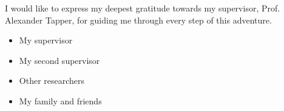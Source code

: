
\cleardoublepage


\begin{acknowledgements}

\hspace{10pt} I would like to express my deepest gratitude towards my supervisor, Prof. Alexander Tapper, for guiding me through every step of this adventure.    

\begin{itemize}
 \item My supervisor
 \vspace*{3mm}
 \item My second supervisor
 \vspace*{3mm}
 \item Other researchers
 \vspace*{3mm}
 \item My family and friends
\end{itemize}

\end{acknowledgements}
